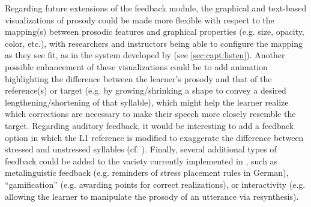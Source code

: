 	Regarding future extensions of the feedback module, the graphical and text-based visualizations of prosody could be made more flexible with respect to the mapping(s) between prosodic features and graphical properties (e.g. size, opacity, color, etc.), with researchers and instructors being able to configure the mapping as they see fit, as in the system developed by \textcite{Sitaram2011} (see \cref{sec:capt:listen}). Another possible enhancement of these visualizations could be to add animation highlighting the difference between the learner's prosody and that of the reference(s) or target (e.g. by growing/shrinking a shape to convey a desired lengthening/shortening of that syllable), which might help the learner realize which corrections are necessary to make their speech more closely resemble the target. 
	Regarding auditory feedback, it would be interesting to add a feedback option in which the L1 reference is modified to exaggerate the difference between stressed and unstressed syllables (cf. \cite{Bissiri2006,Bissiri2009}).
	Finally, several additional types of feedback could be added to the variety currently implemented in , such as  metalinguistic feedback (e.g. reminders of stress placement rules in German), ``gamification'' (e.g. awarding points for correct realizations), or interactivity (e.g. allowing the learner to manipulate the prosody of an utterance via resynthesis). 


	
	
	
	
